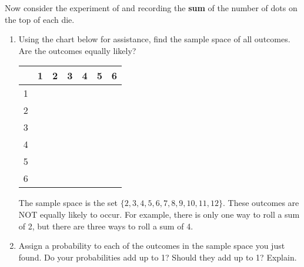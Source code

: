 \documentclass{ccg-topic}
\begin{document}
        \begin{todo}
            \label{todo:summing}
            Now consider the experiment of  and recording the \textbf{sum} of the number of dots on the top of each die.
            	\begin{enumerate}
            	\item Using the chart below for assistance, find the sample space of all outcomes. Are the outcomes equally likely? 
            
            	\begin{center}
            \begin{tabular}{|c||c|c|c|c|c|c|}
            \hline
             & \hspace{.15in} 1 \hspace{.15in} & \hspace{.15in} 2 \hspace{.15in} & \hspace{.15in} 3 \hspace{.15in} & \hspace{.15in} 4 \hspace{.15in} & \hspace{.15in} 5 \hspace{.15in} & \hspace{.15in} 6 \hspace{.15in} \\
             \hline
             \hline
             1 & & & & & & \\
             \hline
             2 & & & & & & \\
             \hline
             3 & & & & & & \\
             \hline
             4 & & & & & & \\
             \hline
             5 & & & & & & \\
             \hline
             6 & & & & & & \\
             \hline    
            \end{tabular}
            \end{center}
            
            	{\answer The sample space is the set $\{2, 3, 4, 5, 6, 7, 8, 9, 10, 11, 12\}$.  These outcomes are NOT equally likely to occur.  For example, there is only one way to roll a sum of 2, but there are three ways to roll a sum of 4.} 
            
            	\item Assign a probability to each of the outcomes in the sample space you just found.  Do your probabilities add up to 1?  Should they add up to 1?  Explain. 
            

\end{enumerate}
\end{todo}
\end{document}
